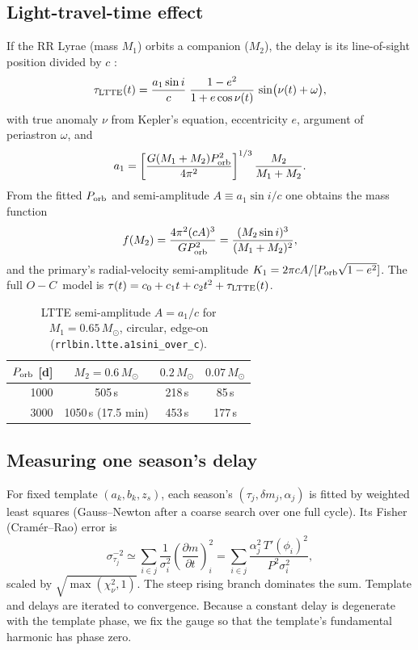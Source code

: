 \documentclass[11pt]{article}
\newcommand{\Msun}{\ensuremath{M_\odot}}
\newcommand{\OC}{\ensuremath{O{-}C}}
\begin{document}
\subsection{Light-travel-time effect}
If the RR Lyrae (mass $M_1$) orbits a companion ($M_2$), the delay is its line-of-sight position divided by $c$
\citep{Irwin1952}:
\begin{equation}\label{eq:ltte}
\tau_{\rm LTTE}(t)=\frac{a_1\sin i}{c}\;\frac{1-e^2}{1+e\cos\nu(t)}\,\sin\!\big(\nu(t)+\omega\big),
\end{equation}
with true anomaly $\nu$ from Kepler's equation, eccentricity $e$, argument of periastron $\omega$, and
\begin{equation}
a_1=\left[\frac{G(M_1+M_2)P_{\rm orb}^2}{4\pi^2}\right]^{1/3}\frac{M_2}{M_1+M_2}.
\end{equation}
From the fitted $P_{\rm orb}$ and semi-amplitude $A\equiv a_1\sin i/c$ one obtains the mass function
\begin{equation}\label{eq:fm}
f(M_2)=\frac{4\pi^2(cA)^3}{G P_{\rm orb}^2}=\frac{(M_2\sin i)^3}{(M_1+M_2)^2},
\end{equation}
and the primary's radial-velocity semi-amplitude $K_1=2\pi c A/[P_{\rm orb}\sqrt{1-e^2}]$.
The full \OC\ model is $\tau(t)=c_0+c_1t+c_2t^2+\tau_{\rm LTTE}(t)$.

\begin{table}[h]
\centering
\caption{LTTE semi-amplitude $A=a_1/c$ for $M_1=0.65\,\Msun$, circular, edge-on (\texttt{rrlbin.ltte.a1sini\_over\_c}).}
\label{tab:amp}
\begin{tabular}{rccc}
\toprule
$P_{\rm orb}$ [d] & $M_2=0.6\,\Msun$ & $0.2\,\Msun$ & $0.07\,\Msun$\\
\midrule
1000 & 505\,s & 218\,s & 85\,s\\
3000 & 1050\,s (17.5 min) & 453\,s & 177\,s\\
\bottomrule
\end{tabular}
\end{table}

\subsection{Measuring one season's delay}
For fixed template $(a_k,b_k,z_s)$, each season's $(\tau_j,\delta m_j,\alpha_j)$ is fitted by weighted least squares
(Gauss--Newton after a coarse search over one full cycle). Its Fisher (Cram\'er--Rao) error is
\begin{equation}\label{eq:fisher}
\sigma_{\tau_j}^{-2}\simeq\sum_{i\in j}\frac{1}{\sigma_i^2}\left(\frac{\partial m}{\partial t}\right)_i^2
=\sum_{i\in j}\frac{\alpha_j^2\,T'(\phi_i)^2}{P^2\sigma_i^2},
\end{equation}
scaled by $\sqrt{\max(\chi^2_\nu,1)}$. The steep rising branch dominates the sum. Template and delays are iterated to
convergence. Because a constant delay is degenerate with the template phase, we fix the gauge so that the
template's fundamental harmonic has phase zero.
\end{document}
